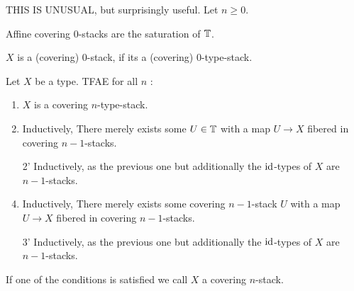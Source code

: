 THIS IS UNUSUAL, but surprisingly useful.
Let $n \ge 0$.
\begin{example}
	Affine covering $0$-stacks are the saturation of $\mathbb{T}$.
\end{example}
\begin{definition}
	$X$ is a (covering) 0-stack, if its a (covering) 0-type-stack.
\end{definition}
\begin{theorem}[TODO]
	Let $X$ be a type. TFAE for all $n$ :
	\begin{enumerate}
		\item $X$ is a covering $n$-type-stack.
		
		\item Inductively, There merely exists some $U \in \mathbb{T}$ with a map $U \to X$ fibered in covering $n-1$-stacks.
		\item[2'] Inductively, as the previous one but additionally the $\operatorname{id}$-types of $X$ are $n-1$-stacks.
		\item Inductively, There merely exists some covering $n-1$-stack $U$ with a map $U \to X$ fibered in covering $n-1$-stacks.		
		\item[3'] Inductively, as the previous one but additionally the $\operatorname{id}$-types of $X$ are $n-1$-stacks.
	\end{enumerate}
	If one of the conditions is satisfied we call $X$ a covering $n$-stack.
\end{theorem}
